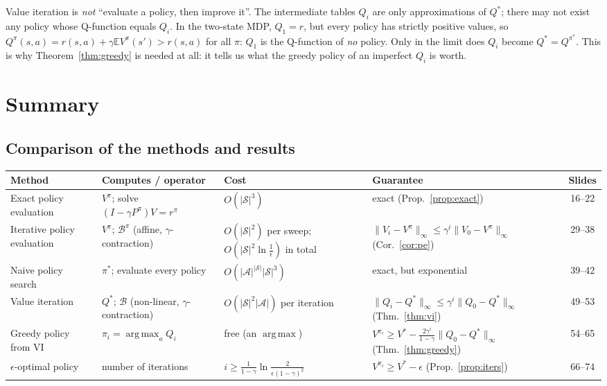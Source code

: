 \documentclass[11pt,a4paper]{article}
\newcommand{\E}{\mathbb{E}}
\newcommand{\cS}{\mathcal{S}}
\newcommand{\cA}{\mathcal{A}}
\newcommand{\Bell}{\mathcal{B}}
\newcommand{\Bpi}{\mathcal{B}^{\pi}}
\newcommand{\norm}[1]{\lVert #1\rVert_\infty}
\DeclareMathOperator*{\argmax}{arg\,max}
\theoremstyle{plain}
\theoremstyle{definition}
\theoremstyle{remark}
\begin{document}
\begin{intuition}
Value iteration is \emph{not} ``evaluate a policy, then improve it''. The intermediate tables $Q_i$ are only approximations of $Q^*$; there may not exist any policy whose Q-function equals $Q_i$. In the two-state MDP, $Q_1=r$, but every policy has strictly positive values, so $Q^\pi(s,a)=r(s,a)+\gamma\E V^\pi(s')>r(s,a)$ for all $\pi$: $Q_1$ is the Q-function of \emph{no} policy. Only in the limit does $Q_i$ become $Q^*=Q^{\pi^*}$. This is why Theorem~\ref{thm:greedy} is needed at all: it tells us what the greedy policy of an imperfect $Q_i$ is worth.
\end{intuition}
\section{Summary}
\subsection{Comparison of the methods and results}
\begin{center}
\small
\renewcommand{\arraystretch}{1.25}
\begin{tabular}{@{}>{\raggedright\arraybackslash}p{2.5cm}>{\raggedright\arraybackslash}p{2.9cm}>{\raggedright\arraybackslash}p{3.7cm}>{\raggedright\arraybackslash}p{4.9cm}c@{}}
\toprule
\textbf{Method} & \textbf{Computes / operator} & \textbf{Cost} & \textbf{Guarantee} & \textbf{Slides}\\
\midrule
Exact policy evaluation & $V^\pi$; solve $(I-\gamma P^\pi)V=r^\pi$ & $O(|\cS|^3)$ & exact (Prop.~\ref{prop:exact}) & 16--22\\
Iterative policy evaluation & $V^\pi$; $\Bpi$ (affine, $\gamma$-contraction) & $O(|\cS|^2)$ per sweep; $O(|\cS|^2\ln\frac1\epsilon)$ in total & $\norm{V_i-V^\pi}\le\gamma^i\norm{V_0-V^\pi}$ (Cor.~\ref{cor:pe}) & 29--38\\
Naive policy search & $\pi^*$; evaluate every policy & $O(|\cA|^{|\cS|}|\cS|^3)$ & exact, but exponential & 39--42\\
Value iteration & $Q^*$; $\Bell$ (non-linear, $\gamma$-contraction) & $O(|\cS|^2|\cA|)$ per iteration & $\norm{Q_i-Q^*}\le\gamma^i\norm{Q_0-Q^*}$ (Thm.~\ref{thm:vi}) & 49--53\\
Greedy policy from VI & $\pi_i=\argmax_aQ_i$ & free (an $\argmax$) & $V^{\pi_i}\ge V^*-\frac{2\gamma^i}{1-\gamma}\norm{Q_0-Q^*}$ (Thm.~\ref{thm:greedy}) & 54--65\\
$\epsilon$-optimal policy & number of iterations & $i\ge\frac1{1-\gamma}\ln\frac{2}{\epsilon(1-\gamma)^2}$ & $V^{\pi_i}\ge V^*-\epsilon$ (Prop.~\ref{prop:iters}) & 66--74\\
\bottomrule
\end{tabular}
\end{center}
\end{document}
